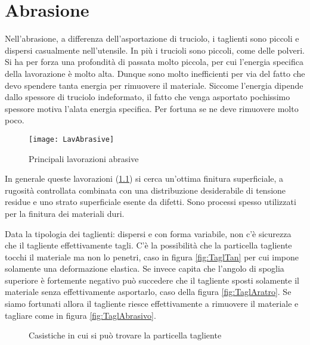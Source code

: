 \chapter{Abrasione}\label{chp:Abrasione}
Nell'abrasione, a differenza dell'asportazione di truciolo, i taglienti sono piccoli e dispersi casualmente nell'utensile.
In più i trucioli sono piccoli, come delle polveri.
Si ha per forza una profondità di passata molto piccola, per cui l'energia specifica della lavorazione è molto alta.
Dunque sono molto inefficienti per via del fatto che devo spendere tanta energia per rimuovere il materiale.
Siccome l'energia dipende dallo spessore di truciolo indeformato, il fatto che venga asportato pochissimo spessore motiva l'alata energia specifica.
Per fortuna se ne deve rimuovere molto poco.

\begin{figure}
\centering
\texttt{[image: LavAbrasive]}
\caption{Principali lavorazioni abrasive}
\label{fig:LavAbrasive}
\end{figure}

In generale queste lavorazioni (\ref{fig:LavAbrasive}) si cerca un'ottima finitura superficiale, a rugosità controllata combinata con una distribuzione desiderabile di tensione residue e uno strato superficiale esente da difetti.
Sono processi spesso utilizzati per la finitura dei materiali duri.

Data la tipologia dei taglienti: dispersi e con forma variabile, non c'è sicurezza che il tagliente effettivamente tagli.
C'è la possibilità che la particella tagliente tocchi il materiale ma non lo penetri, caso in figura \ref{fig:TaglTan} per cui impone solamente una deformazione elastica. 
Se invece capita che l'angolo di spoglia superiore è fortemente negativo può succedere che il tagliente sposti solamente il materiale senza effettivamente asportarlo, caso della figura \ref{fig:TaglAratro}.
Se siamo fortunati allora il tagliente riesce effettivamente a rimuovere il materiale e tagliare come in figura \ref{fig:TaglAbrasivo}.

\begin{figure}
\centering
{}\:
\:
\caption{Casistiche in cui si può trovare la particella tagliente}
\label{fig:PartTagl}
\end{figure}

